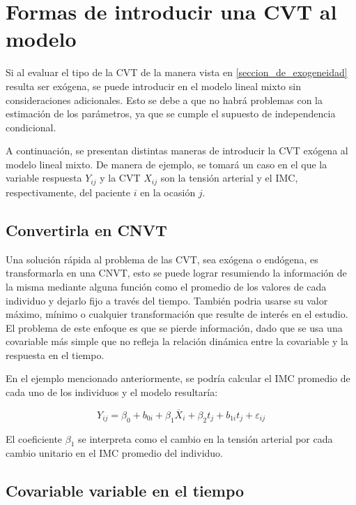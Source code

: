 \documentclass[spanish]{article}
\numberwithin{figure}{subsection}
\numberwithin{equation}{subsection}
\numberwithin{table}{subsection}
\begin{document}
\newpage


\section{Formas de introducir una CVT al modelo}

Si al evaluar el tipo de la CVT de la manera vista en
\ref{seccion_de_exogeneidad} resulta ser exógena, se puede introducir en el
modelo lineal mixto sin consideraciones adicionales. Esto se debe a que no habrá
problemas con la estimación de los parámetros, ya que se cumple el supuesto de
independencia condicional.

A continuación, se presentan distintas maneras de introducir la CVT exógena al
modelo lineal mixto. De manera de ejemplo, se tomará un caso en el que la variable
respuesta $Y_{ij}$ y la CVT $X_{ij}$ son la tensión arterial y el IMC,
respectivamente, del paciente $i$ en la ocasión $j$.

\subsection{Convertirla en CNVT}

Una solución rápida al problema de las CVT, sea exógena o endógena, es
transformarla en una CNVT, esto se puede lograr resumiendo la información de la
misma mediante alguna función como el promedio de los valores de cada individuo
y dejarlo fijo a través del tiempo. También podria usarse su valor máximo,
mínimo o cualquier transformación que resulte de interés en el estudio. El
problema de este enfoque es que se pierde información, dado que se usa una
covariable más simple que no refleja la relación dinámica entre la covariable y
la respuesta en el tiempo.

En el ejemplo mencionado anteriormente, se podría calcular el IMC promedio de
cada uno de los individuos y el modelo resultaría:

\[ Y_{ij} = \beta_0 + b_{0i} + \beta_1 \overline{X}_i + \beta_2 t_j + b_{1i} t_j + \varepsilon_{ij} \]

El coeficiente $\beta_1$ se interpreta como el cambio en la tensión arterial por
cada cambio unitario en el IMC promedio del individuo.

\subsection{Covariable variable en el tiempo}
\end{document}
